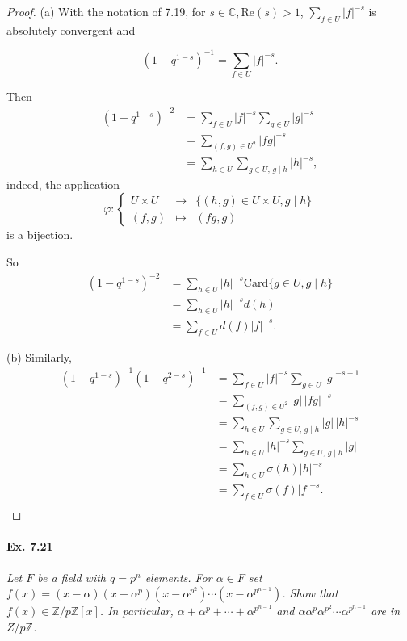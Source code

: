 \documentclass[11pt,a4paper]{article}
\newcommand{\Z}{\mathbb{Z}}
\begin{document}
\begin{proof}
(a) With the notation of 7.19, for $s \in \mathbb{C}, \mathrm{Re}(s) >1$, $ \sum_{f\in U} \vert f \vert^{-s}$ is absolutely convergent and

$$(1-q^{1-s})^{-1} = \sum_{f\in U} \vert f \vert^{-s}.$$

Then
\begin{align*}
(1-q^{1-s})^{-2} &= \sum_{f\in U} \vert f \vert^{-s}\sum_{g\in U} \vert g\vert^{-s}\\
&=\sum_{(f,g)\in U^2} \vert fg\vert^{-s}\\
&= \sum_{h\in U} \sum_{g\in U,\, g\mid h} \vert h \vert^{-s},
\end{align*}
indeed, the application
\[\varphi :
 \left \{
\begin{array}{ccc}
U\times U & \to &   \{(h,g)\in U\times U, g\mid h\}  \\
  (f,g) &   \mapsto &(fg,g)    
\end{array}
\right.
\]
is a bijection.
 
So
 \begin{align*}
 (1-q^{1-s})^{-2} &=\sum_{h\in U}  \vert h \vert^{-s} \mathrm{Card}\{g \in U, g \mid h\}\\
 &= \sum_{h\in U} \vert h \vert^{-s} d(h)\\
 &= \sum_{f\in U} d(f) \vert f \vert^{-s}.
 \end{align*}
 
 (b) Similarly,
 \begin{align*}
 (1-q^{1-s})^{-1}  (1-q^{2-s})^{-1} &= \sum_{f\in U} \vert f \vert^{-s} \sum_{g\in U} \vert g \vert^{-s+1}\\
 &=\sum_{(f,g)\in U^2} \vert g \vert\, \vert fg\vert^{-s}\\
 &= \sum_{h\in U} \sum_{g\in U,\, g\mid h} \vert g \vert \, \vert h \vert^{-s}\\
 &=\sum_{h\in U}\vert h \vert ^{-s}  \sum_{g\in U,\, g\mid h} \vert g \vert\\
 &=\sum_{h\in U}  \sigma(h) \vert h \vert ^{-s}\\
  &=\sum_{f\in U}  \sigma(f) \vert f \vert ^{-s}.\\
 \end{align*}
\end{proof}

\paragraph{Ex. 7.21}

{\it Let $F$ be a field with $q=p^n$ elements. For $\alpha \in F$ set $f(x) = (x-\alpha)(x-\alpha^p)(x-\alpha^{p^2})\cdots(x-\alpha^{p^{n-1}})$. Show that $f(x) \in \Z/p\Z[x]$. In particular, $\alpha + \alpha^p+\cdots+\alpha^{p^{n-1}}$ and $\alpha\alpha^p\alpha^{p^2}\cdots\alpha^{p^{n-1}}$ are in $Z/p\Z$.

}
\end{document}
